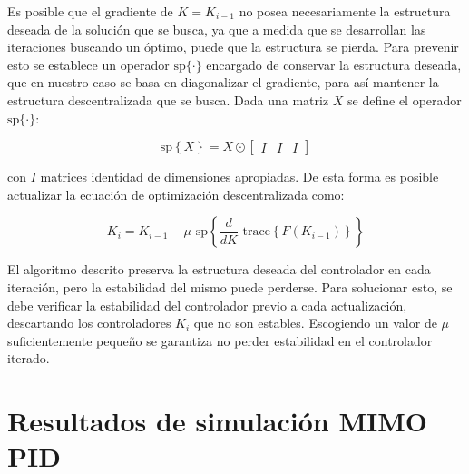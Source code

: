Es posible que el gradiente de $K=K_{i-1}$ no posea necesariamente la estructura deseada de la solución que se busca, ya que a medida que se desarrollan las iteraciones buscando un óptimo, puede que la estructura se pierda. Para prevenir esto se establece un operador $\textrm{sp}\{\cdot\}$ encargado de conservar la estructura deseada, que en nuestro caso se basa en diagonalizar el gradiente, para así mantener la estructura descentralizada que se busca. Dada una matriz $X$ se define el operador $\textrm{sp}\{\cdot\}$:

\begin{equation}
    \textrm{sp} \left\{ X \right\} = X \odot \begin{bmatrix}
        I & I & I
    \end{bmatrix}
\end{equation}

con $I$ matrices identidad de dimensiones apropiadas. De esta forma es posible actualizar la ecuación de optimización descentralizada como:

\begin{equation}
    K_i = K_{i-1} - \mu \textrm{ sp} \left\{\frac{d}{dK}\textrm{ trace}\left\{ F(K_{i-1}) \right\} \right\} 
\end{equation}

El algoritmo descrito preserva la estructura deseada del controlador en cada iteración, pero la estabilidad del mismo puede perderse. Para solucionar esto, se debe verificar la estabilidad del controlador previo a cada actualización, descartando los controladores $K_i$ que no son estables. Escogiendo un valor de $\mu$ suficientemente pequeño se garantiza no perder estabilidad en el controlador iterado.



\newpage
\section{Resultados de simulación MIMO PID}
\label{sec:resultados_mimoPID}

